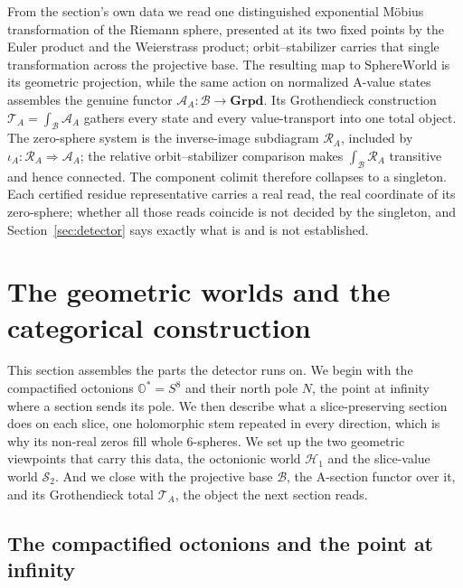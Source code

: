 \documentclass[11pt]{article}
\newcommand{\OO}{\mathbb{O}}
\newcommand{\Ostar}{\OO^{*}}
\providecommand{\SphereWorld}{\mathrm{SphereWorld}}
\theoremstyle{plain}
\theoremstyle{definition}
\theoremstyle{remark}
\begin{document}
From the section's own data we read one distinguished exponential M\"obius transformation of the
Riemann sphere, presented at its two fixed points by the Euler product and the Weierstrass product;
orbit--stabilizer carries that single transformation across the projective base. The resulting map
to $\SphereWorld$ is its geometric projection, while the same action on normalized A-value states
assembles the genuine functor $\mathcal A_A:\mathcal B\to\mathbf{Grpd}$. Its Grothendieck
construction $\mathcal T_A=\int_{\mathcal B}\mathcal A_A$ gathers every state and every
value-transport into one total object. The zero-sphere system is the inverse-image subdiagram
$\mathcal R_A$, included by $\iota_A:\mathcal R_A\Rightarrow\mathcal A_A$; the relative
orbit--stabilizer comparison makes $\int_{\mathcal B}\mathcal R_A$ transitive and hence connected.
The component colimit therefore collapses to a singleton. Each certified residue representative
carries a real read, the real coordinate of its zero-sphere; whether all those reads coincide is
not decided by the singleton, and Section~\ref{sec:detector} says exactly what is and is not
established.

\section{The geometric worlds and the categorical construction}\label{sec:tower-stack}

This section assembles the parts the detector runs on. We begin with the compactified octonions
$\Ostar=S^8$ and their north pole $N$, the point at infinity where a section sends its pole. We then
describe what a slice-preserving section does on each slice, one holomorphic stem repeated in every
direction, which is why its non-real zeros fill whole $6$-spheres. We set up the two geometric
viewpoints that carry this data, the octonionic world $\mathcal H_1$ and the slice-value world
$\mathcal S_2$. And we close with the projective base $\mathcal B$, the A-section functor over it,
and its Grothendieck total $\mathcal T_A$, the object the next section reads.

\subsection*{The compactified octonions and the point at infinity}
\end{document}
